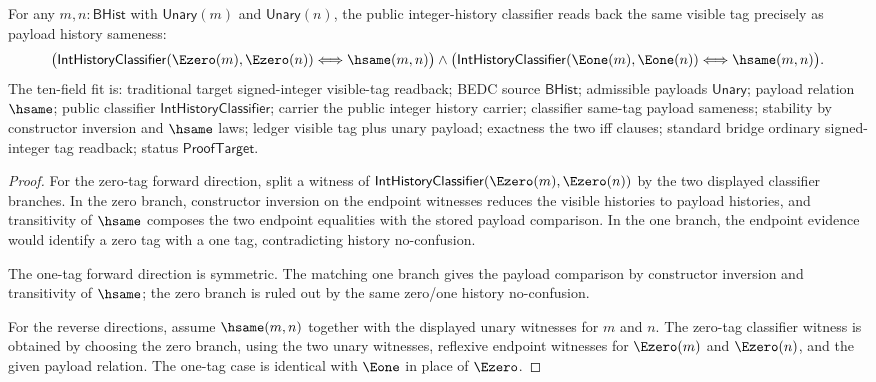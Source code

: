 \begin{theorem}
\label{thm:int-history-classifier-visible-branch-exactness}
For any $m,n:\mathsf{BHist}$ with $\mathsf{Unary}(m)$ and
$\mathsf{Unary}(n)$, the public integer-history classifier reads back the
same visible tag precisely as payload history sameness:
$$
\bigl(
\mathsf{IntHistoryClassifier}(\Ezero(m),\Ezero(n))
\Longleftrightarrow
\hsame(m,n)
\bigr)
\land
\bigl(
\mathsf{IntHistoryClassifier}(\Eone(m),\Eone(n))
\Longleftrightarrow
\hsame(m,n)
\bigr).
$$
The ten-field fit is: traditional target signed-integer visible-tag readback;
BEDC source $\mathsf{BHist}$; admissible payloads $\mathsf{Unary}$; payload
relation $\hsame$; public classifier $\mathsf{IntHistoryClassifier}$; carrier
the public integer history carrier; classifier same-tag payload sameness;
stability by constructor inversion and $\hsame$ laws; ledger visible tag plus
unary payload; exactness the two iff clauses; standard bridge ordinary
signed-integer tag readback; status $\mathsf{ProofTarget}$.
\end{theorem}
\begin{proof}
For the zero-tag forward direction, split a witness of
$\mathsf{IntHistoryClassifier}(\Ezero(m),\Ezero(n))$ by the two displayed
classifier branches. In the zero branch, constructor inversion on the endpoint
witnesses reduces the visible histories to payload histories, and transitivity
of $\hsame$ composes the two endpoint equalities with the stored payload
comparison. In the one branch, the endpoint evidence would identify a zero tag
with a one tag, contradicting history no-confusion.

The one-tag forward direction is symmetric. The matching one branch gives the
payload comparison by constructor inversion and transitivity of $\hsame$; the
zero branch is ruled out by the same zero/one history no-confusion.

For the reverse directions, assume $\hsame(m,n)$ together with the displayed
unary witnesses for $m$ and $n$. The zero-tag classifier witness is obtained by
choosing the zero branch, using the two unary witnesses, reflexive endpoint
witnesses for $\Ezero(m)$ and $\Ezero(n)$, and the given payload relation. The
one-tag case is identical with $\Eone$ in place of $\Ezero$.
\end{proof}


